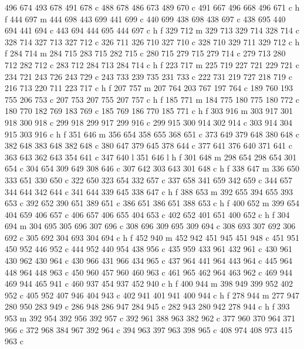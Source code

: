 {{   496 674 493 678 491 678 c
   488 678 486 673 489 670 c
   491 667 496 668 496 671 c
   h f
   444 697 m
   444 698 443 699 441 699 c
   440 699 438 698 438 697 c
   438 695 440 694 441 694 c
   443 694 444 695 444 697 c
   h f
   329 712 m
   329 713 329 714 328 714 c
   328 714 327 713 327 712 c
   326 711 326 710 327 710 c
   328 710 329 711 329 712 c
   h f
   284 714 m
   284 715 283 715 282 715 c
   280 715 279 715 279 714 c
   279 713 280 712 282 712 c
   283 712 284 713 284 714 c
   h f
   223 717 m
   225 719 227 721 229 721 c
   234 721 243 726 243 729 c
   243 733 239 735 231 733 c
   222 731 219 727 218 719 c
   216 713 220 711 223 717 c
   h f
   207 757 m
   207 764 203 767 197 764 c
   189 760 193 755 206 753 c
   207 753 207 755 207 757 c
   h f
   185 771 m
   184 775 180 775 180 772 c
   180 770 182 769 183 769 c
   185 769 186 770 185 771 c
   h f
   303 916 m
   303 917 301 918 300 918 c
   299 918 299 917 299 916 c
   299 915 300 914 302 914 c
   303 914 304 915 303 916 c
   h f
   351 646 m
   356 654 358 655 368 651 c
   373 649 379 648 380 648 c
   382 648 383 648 382 648 c
   380 647 379 645 378 644 c
   377 641 376 640 371 641 c
   363 643 362 643 354 641 c
   347 640 l
   351 646 l
   h f
   301 648 m
   298 654 298 654 301 654 c
   304 654 309 649 308 646 c
   307 642 303 643 301 648 c
   h f
   338 647 m
   336 650 333 651 330 650 c
   322 650 323 654 332 657 c
   337 658 341 659 342 659 c
   344 657 344 644 342 644 c
   341 644 339 645 338 647 c
   h f
   388 653 m
   392 655 394 655 393 653 c
   392 652 390 651 389 651 c
   386 651 386 651 388 653 c
   h f
   400 652 m
   399 654 404 659 406 657 c
   406 657 406 655 404 653 c
   402 652 401 651 400 652 c
   h f
   304 694 m
   304 695 305 696 307 696 c
   308 696 309 695 309 694 c
   308 693 307 692 306 692 c
   305 692 304 693 304 694 c
   h f
   452 940 m
   452 942 451 945 451 948 c
   451 951 450 952 446 952 c
   444 952 440 954 438 956 c
   435 959 433 961 432 961 c
   430 961 430 962 430 964 c
   430 966 431 966 434 965 c
   437 964 441 964 443 964 c
   445 964 448 964 448 963 c
   450 960 457 960 460 963 c
   461 965 462 964 463 962 c
   469 944 469 944 465 941 c
   460 937 454 937 452 940 c
   h f
   400 944 m
   398 949 399 952 402 952 c
   405 952 407 946 404 943 c
   402 941 401 941 400 944 c
   h f
   278 944 m
   277 947 280 950 283 949 c
   286 948 286 947 284 945 c
   282 943 280 942 278 944 c
   h f
   393 953 m
   392 954 392 956 392 957 c
   392 961 388 963 382 962 c
   377 960 370 964 371 966 c
   372 968 384 967 392 964 c
   394 963 397 963 398 965 c
   408 974 408 973 415 963 c
}}
